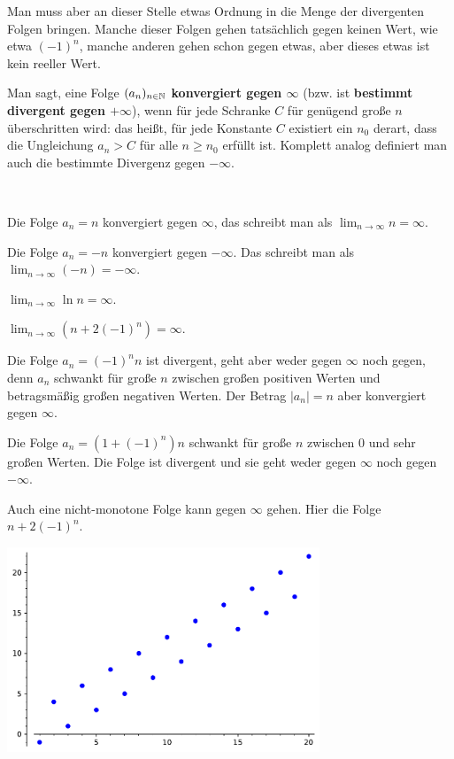 \begin{bem}
	Man muss aber an dieser Stelle etwas Ordnung in die Menge der divergenten Folgen bringen. Manche dieser Folgen gehen tatsächlich gegen keinen Wert, wie etwa $(-1)^n$, manche anderen gehen schon gegen etwas, aber dieses etwas ist kein reeller Wert. 
\end{bem} 

\begin{defn} 
	Man sagt, eine Folge $(a_n)_{n \in \mathbb{N}}$ \textbf{konvergiert gegen $\infty$}  (bzw. ist \textbf{bestimmt divergent gegen $+\infty$}), wenn für jede Schranke $C$ für genügend große $n$ überschritten wird: das heißt, für jede Konstante $C$ existiert ein $n_0$ derart, dass die Ungleichung $a_n > C$ für alle $n \ge n_0$ erfüllt ist. Komplett analog definiert man auch die bestimmte Divergenz gegen $-\infty$. 
\end{defn} 

\begin{bsp} {\ } 
	\begin{enuma}
		\item Die Folge $a_n = n$ konvergiert gegen $\infty$, das schreibt man als $\lim_{n \to \infty} n = \infty$. 
		\item  Die Folge $a_n = -n$ konvergiert gegen $-\infty$. Das schreibt man als $\lim_{n \to \infty} (-n) = -\infty$. 
		\item $\lim_{n \to \infty} \ln n = \infty$. 
		\item $\lim_{n \to \infty} (n + 2 (-1)^n) = \infty$. 
		\item Die Folge $a_n = (-1)^n n$ ist divergent, geht aber weder gegen $\infty$ noch gegen, denn $a_n$ schwankt für große $n$ zwischen großen positiven Werten und betragsmäßig großen negativen Werten. Der Betrag $|a_n| = n$ aber konvergiert gegen $\infty$. 
		\item Die Folge $a_n = ( 1 + (-1)^n) n$ schwankt für große $n$ zwischen $0$ und sehr großen Werten. Die Folge ist divergent und sie geht weder gegen $\infty$ noch gegen $-\infty$. 
	\end{enuma}
\end{bsp} 

\begin{bem}
	Auch eine nicht-monotone Folge kann gegen $\infty$ gehen. 
Hier die Folge $n+ 2 (-1)^n$.
	\begin{center}
			\includegraphics[width=0.7\textwidth]{code/gegen_unendlich.pdf}
	\end{center} 
\end{bem} 


